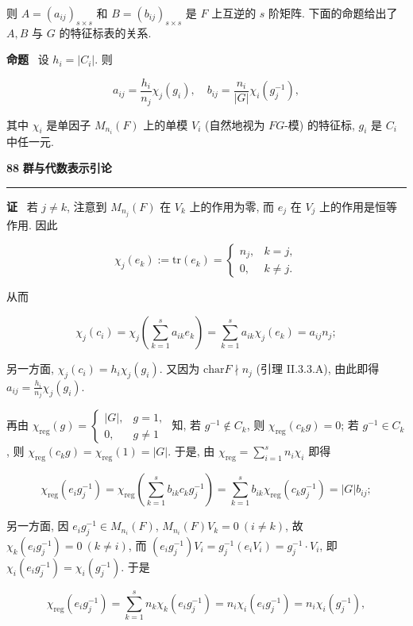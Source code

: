 \documentclass[11pt,a4paper]{article}
\begin{document}
则 $A = (a_{ij})_{s \times s}$ 和 $B = (b_{ij})_{s \times s}$ 是 $F$ 上互逆的 $s$ 阶矩阵. 下面的命题给出了 $A, B$ 与 $G$ 的特征标表的关系.

\vspace{0.5em}
\textbf{命题} \ 设 $h_i = |C_i|$. 则

$$
a_{ij} = \frac{h_i}{n_j} \chi_j(g_i), \quad b_{ij} = \frac{n_i}{|G|} \chi_i(g_j^{-1}),
$$

其中 $\chi_i$ 是单因子 $M_{n_i}(F)$ 上的单模 $V_i$ (自然地视为 $FG$-模) 的特征标, $g_i$ 是 $C_i$ 中任一元.

\newpage
\noindent \textbf{88} \hfill \textbf{群与代数表示引论}
\vspace{0.5em} \hrule \vspace{1.5em}

\textbf{证} \ 若 $j \neq k$, 注意到 $M_{n_j}(F)$ 在 $V_k$ 上的作用为零, 而 $e_j$ 在 $V_j$ 上的作用是恒等作用. 因此

$$
\chi_j(e_k) := \mathrm{tr}(e_k) = \begin{cases}
n_j, & k = j, \\
0, & k \neq j.
\end{cases}
$$

从而

$$
\chi_j(c_i) = \chi_j \left( \sum_{k=1}^s a_{ik}e_k \right) = \sum_{k=1}^s a_{ik} \chi_j(e_k) = a_{ij}n_j;
$$

另一方面, $\chi_j(c_i) = h_i \chi_j(g_i)$. 又因为 $\mathrm{char}F \nmid n_j$ (引理 II.3.3.A), 由此即得 $a_{ij} = \frac{h_i}{n_j} \chi_j(g_i)$.

再由 $\chi_{\mathrm{reg}}(g) = \begin{cases} |G|, & g = 1, \\ 0, & g \neq 1 \end{cases}$ 知, 若 $g^{-1} \notin C_k$, 则 $\chi_{\mathrm{reg}}(c_k g) = 0$; 若 $g^{-1} \in C_k$, 则 $\chi_{\mathrm{reg}}(c_k g) = \chi_{\mathrm{reg}}(1) = |G|$. 于是, 由 $\chi_{\mathrm{reg}} = \sum_{i=1}^s n_i \chi_i$ 即得

$$
\chi_{\mathrm{reg}}(e_i g_j^{-1}) = \chi_{\mathrm{reg}} \left( \sum_{k=1}^s b_{ik} c_k g_j^{-1} \right) = \sum_{k=1}^s b_{ik} \chi_{\mathrm{reg}}(c_k g_j^{-1}) = |G|b_{ij};
$$

另一方面, 因 $e_i g_j^{-1} \in M_{n_i}(F)$, $M_{n_i}(F) V_k = 0 \ (i \neq k)$, 故 $\chi_k(e_i g_j^{-1}) = 0 \ (k \neq i)$, 而 $(e_i g_j^{-1}) V_i = g_j^{-1} (e_i V_i) = g_j^{-1} \cdot V_i$, 即 $\chi_i(e_i g_j^{-1}) = \chi_i(g_j^{-1})$. 于是

$$
\chi_{\mathrm{reg}}(e_i g_j^{-1}) = \sum_{k=1}^s n_k \chi_k(e_i g_j^{-1}) = n_i \chi_i(e_i g_j^{-1}) = n_i \chi_i(g_j^{-1}),
$$
\end{document}
